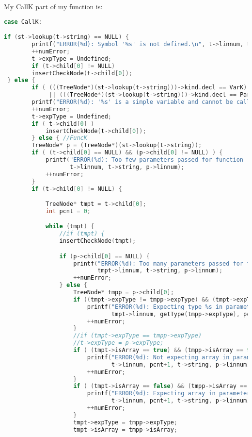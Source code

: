 \documentclass[12pt]{book}
\begin{document}
My CallK part of my function is: 

\begin{lstlisting}[language=c++]
case CallK:

if (st->lookup(t->string) == NULL) {
        printf("ERROR(%d): Symbol '%s' is not defined.\n", t->linnum, t->string);
        ++numError;
        t->expType = Undefined; 
        if (t->child[0] != NULL)
        insertCheckNode(t->child[0]);
 } else {
        if ( (((TreeNode*)(st->lookup(t->string)))->kind.decl == VarK)
             || (((TreeNode*)(st->lookup(t->string)))->kind.decl == ParamK) ) {
        printf("ERROR(%d): '%s' is a simple variable and cannot be called.\n", t->linnum, t->string);
        ++numError;
        t->expType = Undefined;
        if ( t->child[0] )
            insertCheckNode(t->child[0]);
        } else { //FuncK
        TreeNode* p = (TreeNode*)(st->lookup(t->string));
        if ( (t->child[0] == NULL) && (p->child[0] != NULL) ) {
            printf("ERROR(%d): Too few parameters passed for function '%s' defined on line %d.\n", 
                   t->linnum, t->string, p->linnum);
            ++numError;
        }
        if (t->child[0] != NULL) {

            TreeNode* tmpt = t->child[0];
            int pcnt = 0;

            while (tmpt) {
                //if (tmpt) {
                insertCheckNode(tmpt);

                if (p->child[0] == NULL) {
                    printf("ERROR(%d): Too many parameters passed for function '%s' defined on line %d.\n", 
                           tmpt->linnum, t->string, p->linnum);
                    ++numError;
                } else {
                    TreeNode* tmpp = p->child[0];
                    if ((tmpt->expType != tmpp->expType) && (tmpt->expType != Undefined) ) {
                        printf("ERROR(%d): Expecting type %s in parameter %i of call to '%s' defined on line %d but got type %s.\n", 
                               tmpt->linnum, getType(tmpp->expType), pcnt+1, t->string, p->linnum, getType(tmpt->expType));
                        ++numError;
                    }
                    //if (tmpt->expType == tmpp->expType) 
                    //t->expType = p->expType;
                    if ( (tmpt->isArray == true) && (tmpp->isArray == false) ) {
                        printf("ERROR(%d): Not expecting array in parameter %i of call to '%s' defined on line %d.\n", 
                               t->linnum, pcnt+1, t->string, p->linnum);
                        ++numError;
                    }
                    if ( (tmpt->isArray == false) && (tmpp->isArray == true) ) {
                        printf("ERROR(%d): Expecting array in parameter %i of call to '%s' defined on line %d.\n", 
                               t->linnum, pcnt+1, t->string, p->linnum);
                        ++numError;
                    }
                    tmpt->expType = tmpp->expType;
                    tmpt->isArray = tmpp->isArray;


\end{lstlisting}
\end{document}
